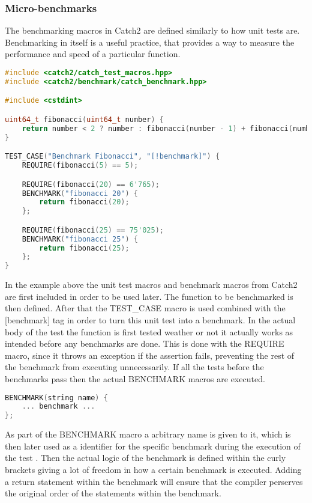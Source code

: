 \subsubsection{Micro-benchmarks}
The benchmarking macros in Catch2 are defined similarly to how unit tests are. Benchmarking in itself is a useful practice, that provides a way to measure the performance
and speed of a particular function.

\begin{minipage}{\textwidth}
\begin{lstlisting}[language=C++, caption=Example of Catch2 benchmark creation]
#include <catch2/catch_test_macros.hpp>
#include <catch2/benchmark/catch_benchmark.hpp>

#include <cstdint>

uint64_t fibonacci(uint64_t number) {
    return number < 2 ? number : fibonacci(number - 1) + fibonacci(number - 2);
}

TEST_CASE("Benchmark Fibonacci", "[!benchmark]") {
    REQUIRE(fibonacci(5) == 5);

    REQUIRE(fibonacci(20) == 6'765);
    BENCHMARK("fibonacci 20") {
        return fibonacci(20);
    };

    REQUIRE(fibonacci(25) == 75'025);
    BENCHMARK("fibonacci 25") {
        return fibonacci(25);
    };
}
\end{lstlisting}
\end{minipage}

In the example above the unit test macros and benchmark macros from Catch2 are first included in order to be used later. The function to be benchmarked is then defined.
After that the TEST\_CASE macro is used combined with the [\!benchmark] tag in order to turn this unit test into a benchmark. In the actual body of the test the function
is first tested weather or not it actually works as intended before any benchmarks are done. This is done with the REQUIRE macro, since it throws an exception if the 
assertion fails, preventing the rest of the benchmark from executing unnecessarily. If all the tests before the benchmarks pass then the actual BENCHMARK macros are
executed.

\begin{minipage}{\textwidth}
\begin{lstlisting}[language=C++]
BENCHMARK(string name) {
    ... benchmark ...
};
\end{lstlisting}
\end{minipage}

As part of the BENCHMARK macro a arbitrary name is given to it, which is then later used as a identifier for the specific benchmark during the execution of the test .
Then the actual logic of the benchmark is defined within the curly brackets giving a lot of freedom in how a certain benchmark is executed. Adding a return statement
within the benchmark will ensure that the compiler perserves the original order of the statements within the benchmark.\\

